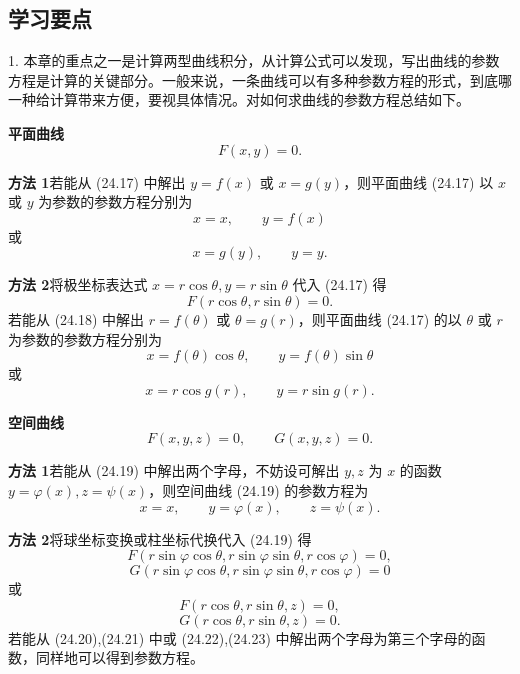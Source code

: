 \subsection{学习要点}

1. 本章的重点之一是计算两型曲线积分，从计算公式可以发现，写出曲线的参数方程是计算的关键部分。一般来说，一条曲线可以有多种参数方程的形式，到底哪一种给计算带来方便，要视具体情况。对如何求曲线的参数方程总结如下。

\textbf{平面曲线}
\begin{equation}
  F(x,y)=0.
  \tag{24.17}
  \label{eq:24.17}
\end{equation}

\textbf{方法 1}\quad 若能从 (24.17) 中解出 $y=f(x)$ 或 $x=g(y)$，则平面曲线 (24.17) 以 $x$ 或 $y$ 为参数的参数方程分别为
\[
  x=x,\qquad y=f(x)
\]
或
\[
  x=g(y),\qquad y=y.
\]

\textbf{方法 2}\quad 将极坐标表达式 $x=r\cos\theta,y=r\sin\theta$ 代入 (24.17) 得
\begin{equation}
  F(r\cos\theta,r\sin\theta)=0.
  \tag{24.18}
  \label{eq:24.18}
\end{equation}
若能从 (24.18) 中解出 $r=f(\theta)$ 或 $\theta=g(r)$，则平面曲线 (24.17) 的以 $\theta$ 或 $r$ 为参数的参数方程分别为
\[
  x=f(\theta)\cos\theta,\qquad y=f(\theta)\sin\theta
\]
或
\[
  x=r\cos g(r),\qquad y=r\sin g(r).
\]

\textbf{空间曲线}
\begin{equation}
  F(x,y,z)=0,\qquad G(x,y,z)=0.
  \tag{24.19}
  \label{eq:24.19}
\end{equation}

\textbf{方法 1}\quad 若能从 (24.19) 中解出两个字母，不妨设可解出 $y,z$ 为 $x$ 的函数 $y=\varphi(x),z=\psi(x)$，则空间曲线 (24.19) 的参数方程为
\[
  x=x,\qquad y=\varphi(x),\qquad z=\psi(x).
\]

\textbf{方法 2}\quad 将球坐标变换或柱坐标代换代入 (24.19) 得
\begin{equation}
  F(r\sin\varphi\cos\theta,r\sin\varphi\sin\theta,r\cos\varphi)=0,
  \tag{24.20}
  \label{eq:24.20}
\end{equation}
\begin{equation}
  G(r\sin\varphi\cos\theta,r\sin\varphi\sin\theta,r\cos\varphi)=0
  \tag{24.21}
  \label{eq:24.21}
\end{equation}
或
\begin{equation}
  F(r\cos\theta,r\sin\theta,z)=0,
  \tag{24.22}
  \label{eq:24.22}
\end{equation}
\begin{equation}
  G(r\cos\theta,r\sin\theta,z)=0.
  \tag{24.23}
  \label{eq:24.23}
\end{equation}
若能从 (24.20),(24.21) 中或 (24.22),(24.23) 中解出两个字母为第三个字母的函数，同样地可以得到参数方程。

